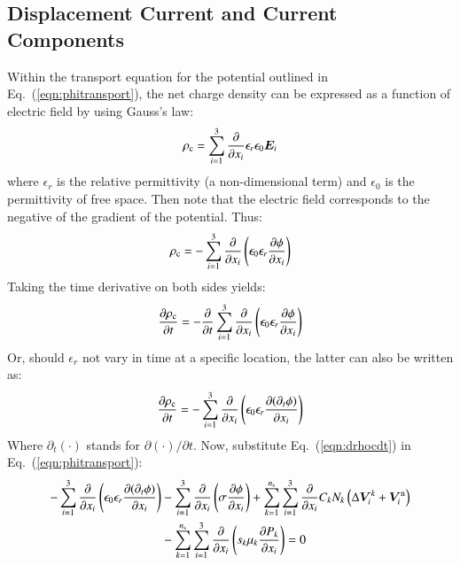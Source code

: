\documentclass{warpdoc}
\newcommand{\alb}{\vspace{0.2cm}\\} %
\newcommand{\ns}{{n_{\rm s}}}
\renewcommand{\vec}[1]{\bm{#1}}
\begin{document}
\subsection{Displacement Current and Current Components}

Within the transport equation for the potential outlined in Eq.\ (\ref{eqn:phitransport}), the net charge density can be expressed as a function of electric field by using Gauss's law:
%
\begin{equation}
  \rho_{\rm c} =  \sum_{i=1}^3 \frac{\partial }{\partial x_i} \epsilon_r \epsilon_0 \vec{E}_i
\end{equation}
%
where $\epsilon_r$ is the relative permittivity (a non-dimensional term) and $\epsilon_0$ is the permittivity of free space. Then note that the electric field corresponds to the negative of the gradient of the potential. Thus:
%
\begin{equation}
  \rho_{\rm c} = - \sum_{i=1}^3 \frac{\partial }{\partial x_i}\left(\epsilon_0 \epsilon_r \frac{\partial \phi}{\partial x_i} \right)
\end{equation}
%
Taking the time derivative on both sides yields:
%
\begin{equation}
  \frac{\partial \rho_{\rm c}}{\partial t} = - \frac{\partial }{\partial t}\sum_{i=1}^3 \frac{\partial }{\partial x_i}\left(\epsilon_0 \epsilon_r \frac{\partial \phi}{\partial x_i} \right)
\end{equation}
%
Or, should $\epsilon_r$ not vary in time at a specific location, the latter can also be written as:
%
\begin{equation}
  \frac{\partial \rho_{\rm c}}{\partial t} = - \sum_{i=1}^3 \frac{\partial }{\partial x_i}\left(\epsilon_0 \epsilon_r \frac{\partial (\partial_t \phi)}{\partial x_i} \right)
\label{eqn:drhocdt}
\end{equation}
%
Where $\partial_t(\cdot)$ stands for $\partial (\cdot)/\partial t$.  Now, substitute Eq.\ (\ref{eqn:drhocdt}) in Eq.\ (\ref{eqn:phitransport}):
%
\begin{align}
- \sum_{i=1}^3 \frac{\partial }{\partial x_i}\left(\epsilon_0 \epsilon_r \frac{\partial (\partial_t \phi)}{\partial x_i} \right)
&- \sum_{i=1}^3 \frac{\partial}{\partial x_i}\left( \sigma  \frac{\partial \phi}{\partial x_i}   \right)
+ \sum_{k=1}^\ns\sum_{i=1}^3 \frac{\partial}{\partial x_i} C_k N_k \left(\Delta \vec{V}^k_i+\vec{V}^{\rm n}_i \right) \nonumber\alb
&- \sum_{k=1}^\ns\sum_{i=1}^3 \frac{\partial}{\partial x_i}  \left({s_k \mu_k} \frac{\partial P_k}{\partial x_i} \right) 
= 0
\end{align}
\end{document}
